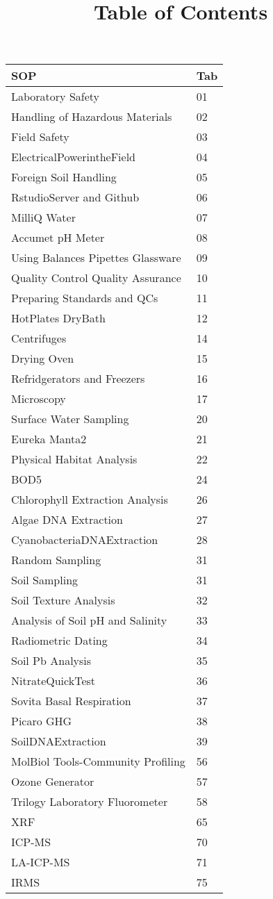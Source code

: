 \documentclass[18pt]{memoir}\usepackage[]{graphicx}\usepackage[]{color}
\title{Table of Contents}
\begin{document}
\begin{table}[ht]
\centering
\begin{tabular}{ll}
  \hline
SOP & Tab \\ 
  \hline
Laboratory Safety & 01 \\ 
  Handling of Hazardous Materials & 02 \\ 
  Field Safety & 03 \\ 
  ElectricalPowerintheField & 04 \\ 
  Foreign Soil Handling & 05 \\ 
  RstudioServer and Github & 06 \\ 
  MilliQ Water & 07 \\ 
  Accumet pH Meter & 08 \\ 
  Using Balances Pipettes Glassware & 09 \\ 
  Quality Control Quality Assurance & 10 \\ 
  Preparing Standards and QCs & 11 \\ 
  HotPlates DryBath & 12 \\ 
  Centrifuges & 14 \\ 
  Drying Oven & 15 \\ 
  Refridgerators and Freezers & 16 \\ 
  Microscopy & 17 \\ 
  Surface Water Sampling & 20 \\ 
  Eureka Manta2 & 21 \\ 
  Physical Habitat Analysis & 22 \\ 
  BOD5 & 24 \\ 
  Chlorophyll Extraction Analysis & 26 \\ 
  Algae DNA Extraction & 27 \\ 
  CyanobacteriaDNAExtraction & 28 \\ 
  Random Sampling & 31 \\ 
  Soil Sampling & 31 \\ 
  Soil Texture Analysis & 32 \\ 
  Analysis of Soil pH and Salinity & 33 \\ 
  Radiometric Dating & 34 \\ 
  Soil Pb Analysis & 35 \\ 
  NitrateQuickTest & 36 \\ 
  Sovita Basal Respiration & 37 \\ 
  Picaro GHG & 38 \\ 
  SoilDNAExtraction & 39 \\ 
  MolBiol Tools-Community Profiling & 56 \\ 
  Ozone Generator & 57 \\ 
  Trilogy Laboratory Fluorometer & 58 \\ 
  XRF & 65 \\ 
  ICP-MS & 70 \\ 
  LA-ICP-MS & 71 \\ 
  IRMS & 75 \\ 
   \hline
\end{tabular}
\end{table}
\end{document}
